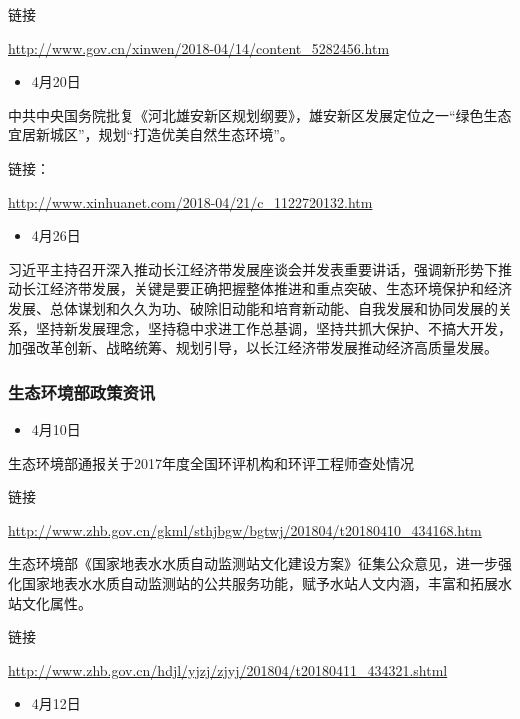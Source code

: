 \documentclass[]{book}
\providecommand{\tightlist}{%
  \setlength{\itemsep}{0pt}\setlength{\parskip}{0pt}}
\begin{document}
链接

\url{http://www.gov.cn/xinwen/2018-04/14/content_5282456.htm}

\begin{itemize}
\tightlist
\item
  4月20日
\end{itemize}

中共中央国务院批复《河北雄安新区规划纲要》，雄安新区发展定位之一``绿色生态宜居新城区''，规划``打造优美自然生态环境''。

链接：

\url{http://www.xinhuanet.com/2018-04/21/c_1122720132.htm}

\begin{itemize}
\tightlist
\item
  4月26日
\end{itemize}

习近平主持召开深入推动长江经济带发展座谈会并发表重要讲话，强调新形势下推动长江经济带发展，关键是要正确把握整体推进和重点突破、生态环境保护和经济发展、总体谋划和久久为功、破除旧动能和培育新动能、自我发展和协同发展的关系，坚持新发展理念，坚持稳中求进工作总基调，坚持共抓大保护、不搞大开发，加强改革创新、战略统筹、规划引导，以长江经济带发展推动经济高质量发展。

\hypertarget{ux751fux6001ux73afux5883ux90e8ux653fux7b56ux8d44ux8baf}{%
\subsubsection*{生态环境部政策资讯}\label{ux751fux6001ux73afux5883ux90e8ux653fux7b56ux8d44ux8baf}}

\begin{itemize}
\tightlist
\item
  4月10日
\end{itemize}

生态环境部通报关于2017年度全国环评机构和环评工程师查处情况

链接

\url{http://www.zhb.gov.cn/gkml/sthjbgw/bgtwj/201804/t20180410_434168.htm}

生态环境部《国家地表水水质自动监测站文化建设方案》征集公众意见，进一步强化国家地表水水质自动监测站的公共服务功能，赋予水站人文内涵，丰富和拓展水站文化属性。

链接

\url{http://www.zhb.gov.cn/hdjl/yjzj/zjyj/201804/t20180411_434321.shtml}

\begin{itemize}
\tightlist
\item
  4月12日
\end{itemize}
\end{document}
